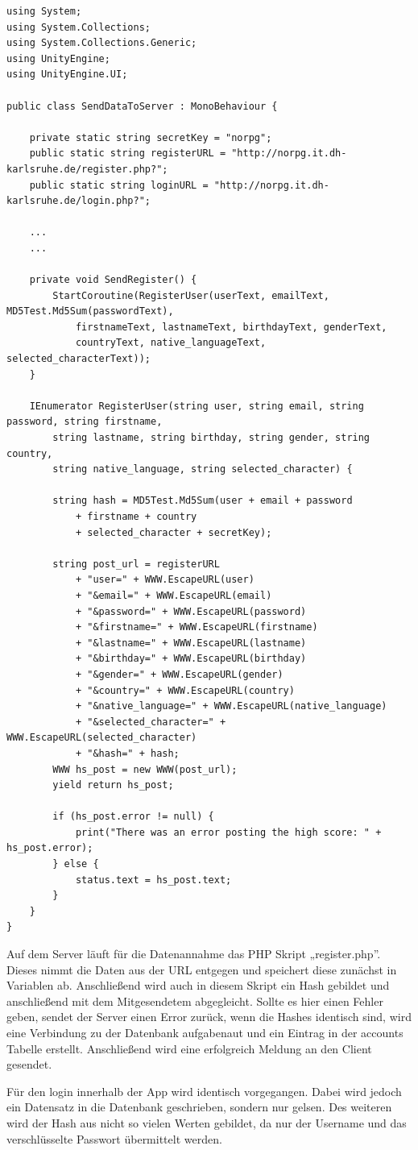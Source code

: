 \begin{scriptsize}
\lstset{
	float,
	caption=Skript SendDataToServer.cs, 
	language=[Sharp]C, 
	frame=single,  
	showstringspaces=false, 
	showspaces=false, 
	numbers=left, 
	captionpos=b, 
	belowcaptionskip=4pt,
	basicstyle=\ttfamily
} 
\begin{lstlisting}[label=lst:c_SendDataToServer]
using System;
using System.Collections;
using System.Collections.Generic;
using UnityEngine;
using UnityEngine.UI;

public class SendDataToServer : MonoBehaviour {

    private static string secretKey = "norpg";
    public static string registerURL = "http://norpg.it.dh-karlsruhe.de/register.php?";
    public static string loginURL = "http://norpg.it.dh-karlsruhe.de/login.php?";

	...
	...

    private void SendRegister() {
        StartCoroutine(RegisterUser(userText, emailText, MD5Test.Md5Sum(passwordText), 
        	firstnameText, lastnameText, birthdayText, genderText, 
        	countryText, native_languageText, selected_characterText));
    }

    IEnumerator RegisterUser(string user, string email, string password, string firstname, 
    	string lastname, string birthday, string gender, string country, 
    	string native_language, string selected_character) {

        string hash = MD5Test.Md5Sum(user + email + password 
        	+ firstname + country 
        	+ selected_character + secretKey);

        string post_url = registerURL
            + "user=" + WWW.EscapeURL(user)
            + "&email=" + WWW.EscapeURL(email)
            + "&password=" + WWW.EscapeURL(password)
            + "&firstname=" + WWW.EscapeURL(firstname)
            + "&lastname=" + WWW.EscapeURL(lastname)
            + "&birthday=" + WWW.EscapeURL(birthday)
            + "&gender=" + WWW.EscapeURL(gender)
            + "&country=" + WWW.EscapeURL(country)
            + "&native_language=" + WWW.EscapeURL(native_language)
            + "&selected_character=" + WWW.EscapeURL(selected_character)
            + "&hash=" + hash;
        WWW hs_post = new WWW(post_url);
        yield return hs_post;

        if (hs_post.error != null) {
            print("There was an error posting the high score: " + hs_post.error);
        } else {
            status.text = hs_post.text;
        }
    }
}

\end{lstlisting}
\end{scriptsize}
Auf dem Server läuft für die Datenannahme das PHP Skript „register.php”. Dieses nimmt die Daten aus der URL entgegen und speichert diese zunächst in Variablen ab. Anschließend wird auch in diesem Skript ein Hash gebildet und anschließend mit dem Mitgesendetem abgegleicht. Sollte es hier einen Fehler geben, sendet der Server einen Error zurück, wenn die Hashes identisch sind, wird eine Verbindung zu der Datenbank aufgabenaut und ein Eintrag in der accounts Tabelle erstellt. Anschließend wird eine erfolgreich Meldung an den Client gesendet.

Für den login innerhalb der App wird identisch vorgegangen. Dabei wird jedoch ein Datensatz in die Datenbank geschrieben, sondern nur gelsen. Des weiteren wird der Hash aus nicht so vielen Werten gebildet, da nur der Username und das verschlüsselte Passwort übermittelt werden.